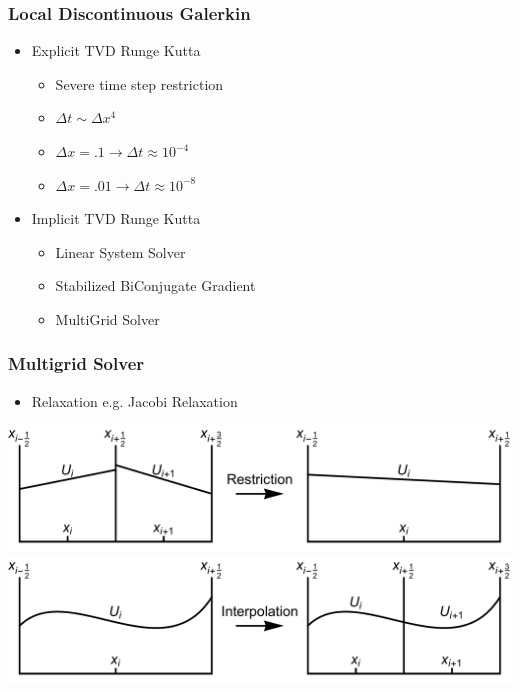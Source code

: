 \documentclass[10pt]{beamer}
\begin{document}
    \begin{frame}
      \frametitle{Local Discontinuous Galerkin}
      \begin{itemize}
        \item Explicit TVD Runge Kutta
          \begin{itemize}
            \item Severe time step restriction
            \item $\Delta t \sim \Delta x^4$
            \item $\Delta x = .1 \to \Delta t \approx 10^{-4}$
            \item $\Delta x = .01 \to \Delta t \approx 10^{-8}$
          \end{itemize}

        \item Implicit TVD Runge Kutta
          \begin{itemize}
            \item Linear System Solver
            \item Stabilized BiConjugate Gradient
            \item MultiGrid Solver
          \end{itemize}
      \end{itemize}
    \end{frame}



    \begin{frame}
      \frametitle{Multigrid Solver}
      \begin{itemize}
        \item Relaxation e.g. Jacobi Relaxation
      \end{itemize}
      \begin{center}
        \includegraphics[scale=0.25]{Figures/restriction.pdf} \\
        \includegraphics[scale=0.25]{Figures/interpolation.pdf}
      \end{center}
    \end{frame}
\end{document}
